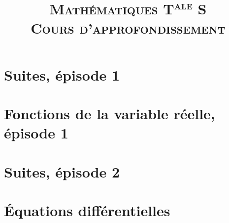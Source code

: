 \documentclass[a4paper]{book}
\title{
    \textsc{
        Mathématiques T\textsuperscript{ale} S \\ Cours d'approfondissement
    }
}
\author{}
\theoremstyle{definition}
\theoremstyle{plain}
\theoremstyle{remark}
\newcommand{\onlyinsubfile}[1]{#1}
\newcommand{\notinsubfile}[1]{}
\begin{document}
\maketitle

\renewcommand{\onlyinsubfile}[1]{}
\renewcommand{\notinsubfile}[1]{#1}

\vspace{1cm}

\tableofcontents
\newpage

\chapter{Suites, épisode 1}

    
\newpage

\chapter{Fonctions de la variable réelle, épisode 1}

    
\newpage

\chapter{Suites, épisode 2}

    
\newpage

\chapter{Équations différentielles}

    
\end{document}
